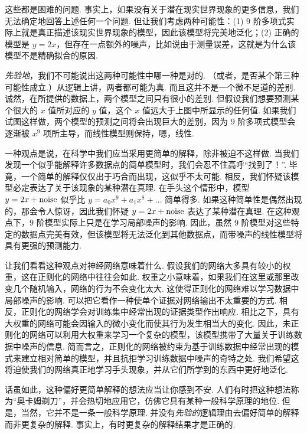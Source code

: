 这些都是困难的问题. 事实上，如果没有关于潜在现实世界现象的更多信息，我们无法确定地回答上述任何一个问题. 但让我们考虑两种可能性：(1) $9$ 阶多项式实际上就是真正描述该现实世界现象的模型，因此该模型将完美地泛化；(2) 正确的模型是 $y = 2x$，但存在一点额外的噪声，比如说由于测量误差，这就是为什么该模型不是精确拟合的原因.

\emph{先验地}，我们不可能说出这两种可能性中哪一种是对的. （或者，是否某个第三种可能性成立.）从逻辑上讲，两者都可能为真. 而且这并不是一个微不足道的差别. 诚然，在所提供的数据上，两个模型之间只有很小的差别. 但假设我们想要预测某个很大的 $x$ 值所对应的 $y$ 值，这个 $x$ 值远大于上图中所显示的任何值. 如果我们试图这样做，两个模型的预测之间将会出现巨大的差别，因为 $9$ 阶多项式模型会逐渐被 $x^9$ 项所主导，而线性模型则保持，嗯，线性.

一种观点是说，在科学中我们应当采用更简单的解释，除非被迫不这样做. 当我们发现一个似乎能解释许多数据点的简单模型时，我们会忍不住高呼``找到了！''. 毕竟，一个简单的解释仅仅出于巧合而出现，这似乎不太可能. 相反，我们怀疑该模型必定表达了关于该现象的某种潜在真理. 在手头这个情形中，模型 $y = 2x+{\rm noise}$ 似乎比 $y = a_0 x^9 + a_1 x^8 + \ldots$ 简单得多. 如果这种简单性是偶然出现的，那会令人惊讶，因此我们怀疑 $y = 2x+{\rm noise}$ 表达了某种潜在真理. 在这种观点下，9 阶模型实际上只是在学习局部噪声的影响. 因此，虽然 9 阶模型对这些特定的数据点完美有效，但该模型将无法泛化到其他数据点，而带噪声的线性模型将具有更强的预测能力.

让我们看看这种观点对神经网络意味着什么. 假设我们的网络大多具有较小的权重，这在正则化的网络中往往会如此. 权重之小意味着，如果我们在这里或那里改变几个随机输入，网络的行为不会变化太大. 这使得正则化的网络难以学习数据中局部噪声的影响. 可以把它看作一种使单个证据对网络输出不太重要的方式. 相反，正则化的网络学会对训练集中经常出现的证据类型作出响应. 相比之下，具有大权重的网络可能会因输入的微小变化而使其行为发生相当大的变化. 因此，未正则化的网络可以利用大权重来学习一个复杂的模型，该模型携带了大量关于训练数据中噪声的信息. 简而言之，正则化的网络被约束为基于训练数据中经常出现的模式来建立相对简单的模型，并且抗拒学习训练数据中噪声的奇特之处. 我们希望这将迫使我们的网络真正地学习手头现象，并从它们所学到的东西中更好地泛化.

话虽如此，这种偏好更简单解释的想法应当让你感到不安. 人们有时把这种想法称为``奥卡姆剃刀''，并会热切地应用它，仿佛它具有某种一般科学原理的地位. 但是，当然，它并不是一条一般科学原理. 并没有\emph{先验的}逻辑理由去偏好简单的解释而非更复杂的解释. 事实上，有时更复杂的解释结果才是正确的.


